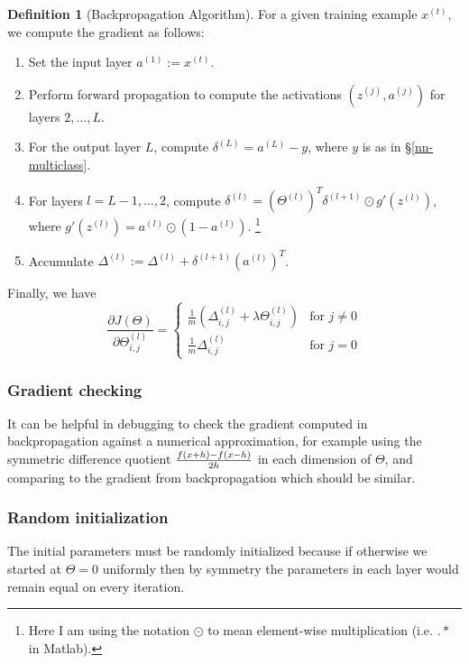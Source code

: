 \documentclass[a4paper,12pt]{article}
\theoremstyle{definition}
\newtheorem*{defn}{Definition}
\begin{document}
\begin{defn}[Backpropagation Algorithm] 
For a given training example $x^{(t)}$, we compute the gradient as follows:

\begin{enumerate}
\item Set the input layer $a^{(1)} := x^{(t)}$.
\item Perform forward propagation to compute the activations $(z^{(j)}, a^{(j)})$ for layers $2, \ldots, L$.
\item For the output layer $L$, compute $\delta^{(L)} = a^{(L)} - y$, where $y$ is as in \S\ref{nn-multiclass}.
\item For layers $l = L-1, \ldots, 2$, compute $\delta^{(l)} = (\Theta^{(l)} )^T \delta^{(l+1)} \odot g'(z^{(l)})$, where $g'(z^{(l)}) = a^{(l)} \odot (1 - a^{(l)})$. \footnote{Here I am using the notation $\odot$ to mean element-wise multiplication (i.e. $.*$ in Matlab).}
\item Accumulate $\Delta^{(l)} := \Delta^{(l)} + \delta^{(l+1)} (a^{(l)})^T$.
\end{enumerate}
Finally, we have
\[
\frac{\partial J(\Theta)}{\partial \Theta_{i,j}^{(l)}} = 
\begin{cases}
\frac{1}{m} \left( \Delta_{i,j}^{(l)}  + \lambda \Theta_{i, j}^{(l)} \right) & \text{for } j \neq 0 \\
\frac{1}{m} \Delta_{i,j}^{(l)}  & \text{for } j = 0
\end{cases}
\]
\end{defn}

\subsubsection{Gradient checking}
It can be helpful in debugging to check the gradient computed in backpropagation against a numerical approximation, for example using the symmetric difference quotient $f(x+h)-f(x-h) \over 2h$ in each dimension of $\Theta$, and comparing to the gradient from backpropagation which should be similar.

\subsubsection{Random initialization}
The initial parameters must be randomly initialized because if otherwise we started at $\Theta = 0$ uniformly then by symmetry the parameters in each layer would remain equal on every iteration.
\end{document}
